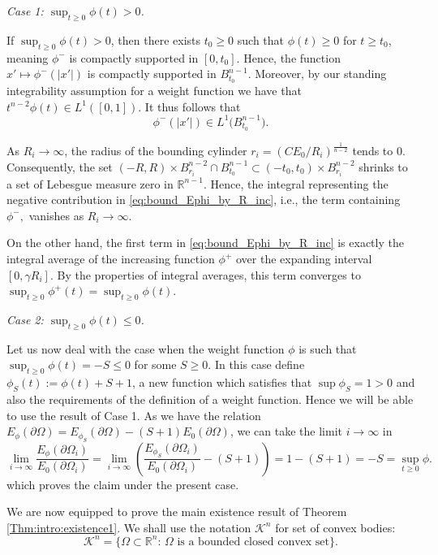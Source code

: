 \documentclass[10pt,leqno]{amsart}
\makeatletter
\newcommand{\R}[0]{\mathbb{R}}
\newcommand{\delomega}{\partial\Omega}
\numberwithin{Theorem}{section}
\theoremstyle{definition}
\theoremstyle{remark}
\numberwithin{equation}{section}
\numberwithin{equation}{section}
\newenvironment{customproof}[1]{%
  \par\pushQED{\qed}%
  \normalfont\topsep6pt \trivlist
  \item[\hskip\labelsep\itshape
    Proof of #1\@addpunct{.}]\ignorespaces
}{%
  \popQED\endtrivlist\@endpefalse
}
\makeatother
\begin{document}
\begin{customproof}{Lemma \ref{lm:bound_on_max_radius_decreasing}}
\smallskip

\textit{Case 1: $\sup_{t \ge 0} \phi(t) > 0$.}


If $\sup_{t \ge 0} \phi(t) > 0$, then there exists $t_0 \ge 0$ such that $\phi(t) \ge 0$ for $t \ge t_0$, meaning $\phi^-$ is compactly supported in $[0, t_0]$.
Hence, the function $x'\mapsto \phi^-(|x'|)$ is compactly supported in $B_{t_0}^{n-1}$. Moreover, by our standing integrability assumption for a weight function we have that $t^{n-2}\phi(t) \in L^1([0,1])$. It thus follows that 
$$
   \phi^-(|x'|) \in L^1\big(B_{t_0}^{n-1}\big).
$$

As $R_i \to \infty$, the radius of the bounding cylinder $r_i=(C E_0/R_i)^{\frac{1}{n-2}}$ tends to $0$. Consequently, the set $(-R,R) \times B^{n-2}_{r_i}\cap B_{t_0}^{n-1}\subset (-t_0,t_0)\times B_{r_i}^{n-2}$ shrinks to a set of Lebesgue measure zero in $\R^{n-1}$. 
Hence, the integral representing the negative contribution in \eqref{eq:bound_Ephi_by_R_inc}, i.e., the term containing $\phi^-,$ vanishes as $R_i \to \infty$.

On the other hand, the first term in \eqref{eq:bound_Ephi_by_R_inc} is exactly the integral average of the increasing function $\phi^+$ over the expanding interval $[0, \gamma R_i]$. By the properties of integral averages, this term converges to $\sup_{t \ge 0} \phi^+(t) = \sup_{t \ge 0} \phi(t)$. 

\smallskip

\textit{Case 2: $\sup_{t \ge 0} \phi(t) \leq 0$.}

Let us now deal with the case when the weight function $\phi$ is such that $\sup_{t\geq 0}\phi(t)=-S\leq 0$ for some $S\geq0.$ In this case define $ \phi_S(t):=\phi(t)+S+1$, a new function which satisfies that $\sup\phi_S=1>0$ and also the requirements of the definition of a weight function. Hence we will be able to use the result of Case 1. As we have the relation $E_\phi(\delomega)=E_{\phi_S}(\delomega)-(S+1)E_0(\delomega)$, we can take the limit $i\to\infty$ in
$$
\lim_{i\to\infty}\frac{E_\phi(\delomega_i)}{E_0(\delomega_i)}=\lim_{i\to\infty}\left(\frac{E_{\phi_S}(\delomega_i)}{E_0(\delomega_i)}-(S+1)\right)=1-(S+1)=-S=\sup_{t\geq 0}\phi. 
$$
which proves the claim under the present case. 
\end{customproof}


We are now equipped to prove the main existence result of Theorem \ref{Thm:intro:existence1}. We shall use the notation  $\mathcal{K}^n$ for set of convex bodies:
$$
  \mathcal{K}^n=\{\Omega\subset\R^n:\, \Omega\text{ is a bounded closed convex set}\}.
$$
\end{document}
